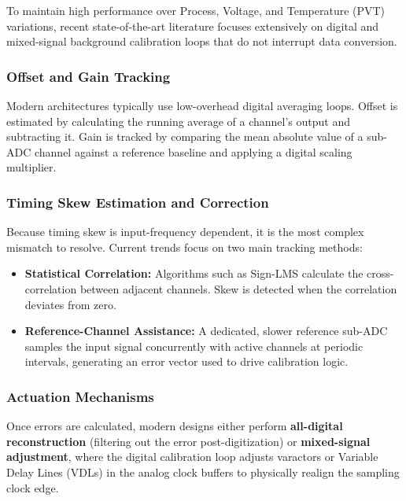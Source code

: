 To maintain high performance over Process, Voltage, and Temperature (PVT) variations,
recent state-of-the-art literature focuses extensively on digital and mixed-signal background
calibration loops that do not interrupt data conversion.

\subsubsection{Offset and Gain Tracking}

Modern architectures typically use low-overhead digital averaging loops. Offset is estimated by
calculating the running average of a channel's output and subtracting it. Gain is tracked by
comparing the mean absolute value of a sub-ADC channel against a reference baseline and
applying a digital scaling multiplier.

\subsubsection{Timing Skew Estimation and Correction}

Because timing skew is input-frequency dependent, it is the most complex mismatch to resolve.
Current trends focus on two main tracking methods:

\begin{itemize}
	\item \textbf{Statistical Correlation:} Algorithms such as Sign-LMS calculate the
	cross-correlation between adjacent channels. Skew is detected when the correlation
	deviates from zero.
	
	\item \textbf{Reference-Channel Assistance:} A dedicated, slower reference sub-ADC samples
	the input signal concurrently with active channels at periodic intervals, generating
	an error vector used to drive calibration logic.
\end{itemize}

\subsubsection{Actuation Mechanisms}

Once errors are calculated, modern designs either perform \textbf{all-digital reconstruction}
(filtering out the error post-digitization) or \textbf{mixed-signal adjustment}, where the
digital calibration loop adjusts varactors or Variable Delay Lines (VDLs) in the analog clock
buffers to physically realign the sampling clock edge.

